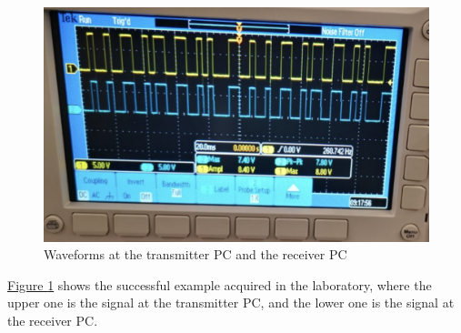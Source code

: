 \documentclass[12pt,a4paper]{report}
\begin{document}
\begin{figure}[ht]
    \centerline{\includegraphics[scale=1]{raw_waveform_compare}}
    \caption{Waveforms at the transmitter PC and the receiver PC}
    \label{fig:raw_bit_waveform}
\end{figure}

\hyperref[fig:raw_bit_waveform]{Figure \ref*{fig:raw_bit_waveform}} shows the successful example acquired in the laboratory, where the upper one is the signal at the transmitter PC, and the lower one is the signal at the receiver PC.
\end{document}
